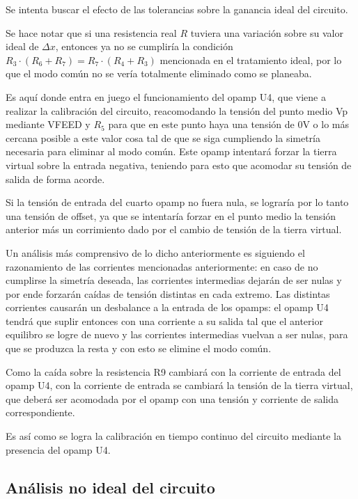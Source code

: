 \documentclass[../../tc_tp3_main.tex]{subfiles}
\begin{document}
Se intenta buscar el efecto de las tolerancias sobre la ganancia ideal del circuito.\par
Se hace notar que si una resistencia real $R$ tuviera una variación sobre su valor ideal de $\Delta x$, entonces ya no se cumpliría la condición $R_3\cdot (R_6 + R_7) = R_7\cdot (R_4 + R_3)$ mencionada en el tratamiento ideal, por lo que el modo común no se vería totalmente eliminado como se planeaba.\par 
Es aquí donde entra en juego el funcionamiento del opamp U4, que viene a realizar la calibración del circuito, reacomodando la tensión del punto medio Vp mediante VFEED y $R_5$ para que en este punto haya una tensión de 0V o lo más cercana posible a este valor cosa tal de que se siga cumpliendo la simetría necesaria para eliminar al modo común. 
Este opamp intentará forzar la tierra virtual sobre la entrada negativa, teniendo para esto que acomodar su tensión de salida de forma acorde. \par
Si la tensión de entrada del cuarto opamp no fuera nula, se lograría por lo tanto una tensión de offset, ya que se intentaría forzar en el punto medio la tensión anterior más un corrimiento dado por el cambio de tensión de la tierra virtual. \par
Un análisis más comprensivo de lo dicho anteriormente es siguiendo el razonamiento de las corrientes mencionadas anteriormente: en caso de no cumplirse la simetría deseada, las corrientes intermedias dejarán de ser nulas y por ende forzarán caídas de tensión distintas en cada extremo. Las distintas corrientes causarán un desbalance a la entrada de los opamps: el opamp U4 tendrá que suplir entonces con una corriente a su salida tal que el anterior equilibro se logre de nuevo y las corrientes intermedias vuelvan a ser nulas, para que se produzca la resta y con esto se elimine el modo común.\par
 Como la caída sobre la resistencia R9 cambiará con la corriente de entrada del opamp U4, con la corriente de entrada se cambiará la tensión de la tierra virtual, que deberá ser acomodada por el opamp con una tensión y corriente de salida correspondiente.\par
 Es así como se logra la calibración en tiempo continuo del circuito mediante la presencia del opamp U4.\par

  
\subsection{Análisis no ideal del circuito}
\end{document}
